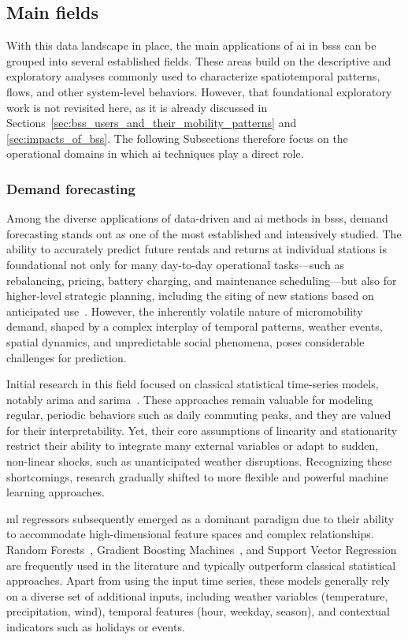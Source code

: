 \subsection[Main fields]{Main fields}

With this data landscape in place, the main applications of \ac{ai} in \acp{bss} can be grouped into several established fields. These areas build on the descriptive and exploratory analyses commonly used to characterize spatiotemporal patterns, flows, and other system-level behaviors. However, that foundational exploratory work is not revisited here, as it is already discussed in Sections~\ref{sec:bss_users_and_their_mobility_patterns} and \ref{sec:impacts_of_bss}. The following Subsections therefore focus on the operational domains in which \ac{ai} techniques play a direct role.

    \subsubsection{Demand forecasting}

    Among the diverse applications of data-driven and \ac{ai} methods in \acp{bss}, demand forecasting stands out as one of the most established and intensively studied. The ability to accurately predict future rentals and returns at individual stations is foundational not only for many day-to-day operational tasks—such as rebalancing, pricing, battery charging, and maintenance scheduling—but also for higher-level strategic planning, including the siting of new stations based on anticipated use~\cite{Liang2023}. However, the inherently volatile nature of micromobility demand, shaped by a complex interplay of temporal patterns, weather events, spatial dynamics, and unpredictable social phenomena, poses considerable challenges for prediction.

    Initial research in this field focused on classical statistical time-series models, notably \ac{arima} and \ac{sarima}~\cite{Yoon2012, Kaltenbrunner2010}. These approaches remain valuable for modeling regular, periodic behaviors such as daily commuting peaks, and they are valued for their interpretability. Yet, their core assumptions of linearity and stationarity restrict their ability to integrate many external variables or adapt to sudden, non-linear shocks, such as unanticipated weather disruptions. Recognizing these shortcomings, research gradually shifted to more flexible and powerful machine learning approaches.

    \ac{ml} regressors subsequently emerged as a dominant paradigm due to their ability to accommodate high-dimensional feature spaces and complex relationships. Random Forests~\cite{Wang2018, Ruffieux2017}, Gradient Boosting Machines~\cite{Li2015, Sathishkumar2020}, and Support Vector Regression~\cite{Sathishkumar2020} are frequently used in the literature and typically outperform classical statistical approaches. Apart from using the input time series, these models generally rely on a diverse set of additional inputs, including weather variables (temperature, precipitation, wind), temporal features (hour, weekday, season), and contextual indicators such as holidays or events.

